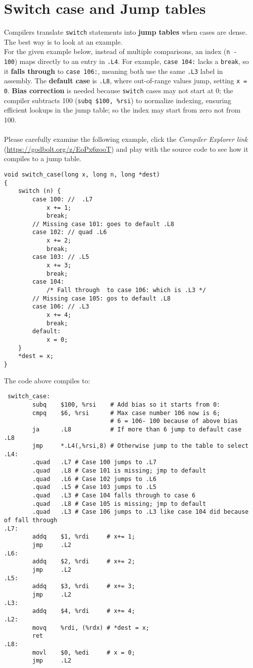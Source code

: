 \section{Switch case and Jump tables}
Compilers translate \texttt{switch} statements into \textbf{jump tables} when cases are dense. 
The best way is to look at an example. 
\\
For the given example below, instead of multiple comparisons, an index (\texttt{n - 100}) maps directly to an entry in \texttt{.L4}. For example, \texttt{case 104:} lacks a \texttt{break}, so it \textbf{falls through} to \texttt{case 106:}, meaning both use the same \texttt{.L3} label in assembly. The \textbf{default case} is \texttt{.L8}, where out-of-range values jump, setting \texttt{x = 0}. \textbf{Bias correction} is needed because \texttt{switch} cases may not start at 0; the compiler subtracts 100 (\texttt{subq \$100, \%rsi}) to normalize indexing, ensuring efficient lookups in the jump table; so the index may start from zero not from 100. \\
\\
Please carefully examine the following example, click the \textit{Compiler Explorer link }(\url{https://godbolt.org/z/EoPx6zooT}) and play with the source code to see how it compiles to a jump table. \\

\begin{verbatim}
void switch_case(long x, long n, long *dest)
{
    switch (n) {
        case 100: //  .L7
            x += 1;
            break;
        // Missing case 101: goes to default .L8
        case 102: // quad .L6
            x += 2;
            break;
        case 103: // .L5
            x += 3;
            break;
        case 104:
            /* Fall through  to case 106: which is .L3 */
        // Missing case 105: gos to default .L8
        case 106: // .L3
            x += 4;
            break;
        default:
            x = 0;
    }
    *dest = x;
}
\end{verbatim}
The code above compiles to:
\begin{verbatim}
 switch_case:
        subq    $100, %rsi    # Add bias so it starts from 0: 
        cmpq    $6, %rsi      # Max case number 106 now is 6;
                              # 6 = 106- 100 because of above bias
        ja      .L8           # If more than 6 jump to default case .L8
        jmp     *.L4(,%rsi,8) # Otherwise jump to the table to select
.L4:
        .quad   .L7 # Case 100 jumps to .L7
        .quad   .L8 # Case 101 is missing; jmp to default
        .quad   .L6 # Case 102 jumps to .L6
        .quad   .L5 # Case 103 jumps to .L5
        .quad   .L3 # Case 104 falls through to case 6
        .quad   .L8 # Case 105 is missing; jmp to default
        .quad   .L3 # Case 106 jumps to .L3 like case 104 did because of fall through
.L7:
        addq    $1, %rdi     # x+= 1;
        jmp     .L2
.L6:
        addq    $2, %rdi     # x+= 2;
        jmp     .L2
.L5:
        addq    $3, %rdi     # x+= 3;
        jmp     .L2
.L3:
        addq    $4, %rdi     # x+= 4;
.L2:
        movq    %rdi, (%rdx) # *dest = x;
        ret
.L8:
        movl    $0, %edi     # x = 0;
        jmp     .L2
\end{verbatim}

